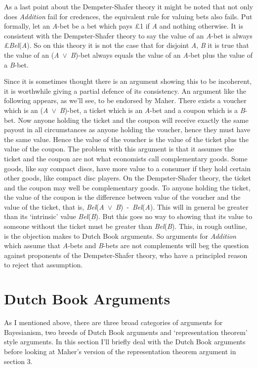 As a last point about the Dempster-Shafer theory it might be noted that not only does \textit{Addition} fail for credences, the equivalent rule for valuing bets also fails. Put formally, let an \textit{A}\nobreakdash-bet be a bet which pays \pounds1 if \textit{A} and nothing otherwise. It is consistent with the Dempster-Shafer theory to say the value of an \textit{A}\nobreakdash-bet is always \pounds\textit{Bel}(\textit{A}). So on this theory it is not the case that for disjoint \textit{A}, \textit{B} it is true that the value of an (\textit{A}~${\vee}$~\textit{B})\nobreakdash-bet always equals the value of an \textit{A}\nobreakdash-bet plus the value of a \textit{B}\nobreakdash-bet.

Since it is sometimes thought there is an argument showing this to be incoherent, it is worthwhile giving a partial defence of its consistency. An argument like the following appears, as we'll see, to be endorsed by Maher. There exists a voucher which is an (\textit{A}~${\vee}$~\textit{B})\nobreakdash-bet, a ticket which is an \textit{A}\nobreakdash-bet and a coupon which is a \textit{B}\nobreakdash-bet. Now anyone holding the ticket and the coupon will receive exactly the same payout in all circumstances as anyone holding the voucher, hence they must have the same value. Hence the value of the voucher is the value of the ticket plus the value of the coupon. The problem with this argument is that it assumes the ticket and the coupon are not what economists call complementary goods. Some goods, like say compact discs, have more value to a consumer if they hold certain other goods, like compact disc players. On the Dempster-Shafer theory, the ticket and the coupon may well be complementary goods. To anyone holding the ticket, the value of the coupon is the difference between value of the voucher and the value of the ticket, that is, \textit{Bel}(\textit{A}~${\vee}$~\textit{B})~-~\textit{Bel}(\textit{A}). This will in general be greater than its `intrinsic' value \textit{Bel}(\textit{B}). But this goes no way to showing that its value to someone without the ticket must be greater than \textit{Bel}(\textit{B}). This, in rough outline, is the objection \citet{Schick1986} makes to Dutch Book arguments. So arguments for \textit{Addition} which assume that \textit{A}\nobreakdash-bets and \textit{B}\nobreakdash-bets are not complements will beg the question against proponents of the Dempster-Shafer theory, who have a principled reason to reject that assumption.

\section{Dutch Book Arguments}
As I mentioned above, there are three broad categories of arguments for Bayesianism, two breeds of Dutch Book arguments and `representation theorem' style arguments. In this section I'll briefly deal with the Dutch Book arguments before looking at Maher's version of the representation theorem argument in section 3.

